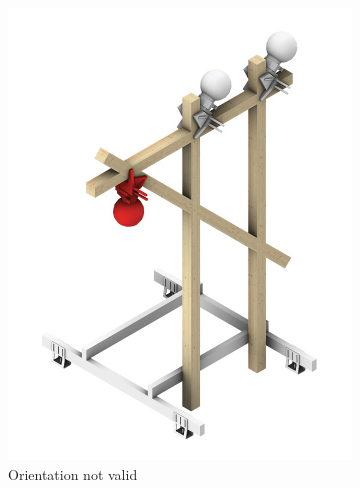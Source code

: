 \begin{figure}
    \centering
    \begin{subfigure}[b]{0.32\textwidth}
        \centering
        \includegraphics[width=\textwidth]{images/05/clamp-assignment-1.png}
        \caption{Orientation not valid}
        \label{fig:clamp-assignment-1}
    \end{subfigure}
    \hfill
    \begin{subfigure}[b]{0.32\textwidth}
        \centering

\end{subfigure}
\end{figure}
